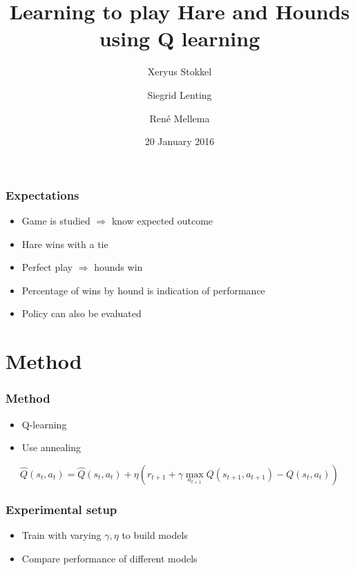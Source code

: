 \documentclass{beamer}
\title{Learning to play Hare and Hounds using Q learning}
\author{Xeryus Stokkel \and Siegrid Lenting \and Ren\'e Mellema}
\date{20 January 2016}
\begin{document}
\begin{frame}
    \maketitle
\end{frame}


\begin{frame}
    \frametitle{Expectations}
    \begin{itemize}[<+->]
        \item<1-> Game is studied \pause $\Rightarrow$ know expected outcome
        \item<3-> Hare wins with a tie
        \item<4-> Perfect play $\Rightarrow$ hounds win
        \item<5-> Percentage of wins by hound is indication of performance
        \item<6-> Policy can also be evaluated
    \end{itemize}
\end{frame}

\section{Method}
\begin{frame}
	\frametitle{Method}
	\begin{itemize}
		\item Q-learning
		\item Use annealing
	\end{itemize}
	\[ \hat{Q}(s_t, a_t) = \hat{Q}(s_t, a_t) + \eta \left(r_{t+1} + \gamma \max_{a_{t+1}} Q(s_{t+1}, a_{t+1}) - Q(s_t, a_t)\right) \]
\end{frame}

\begin{frame}
	\frametitle{Experimental setup}
	\begin{itemize}
		\item Train with varying $\gamma, \eta$ to build models
		\item Compare performance of different models
	\end{itemize}
\end{frame}
\end{document}
